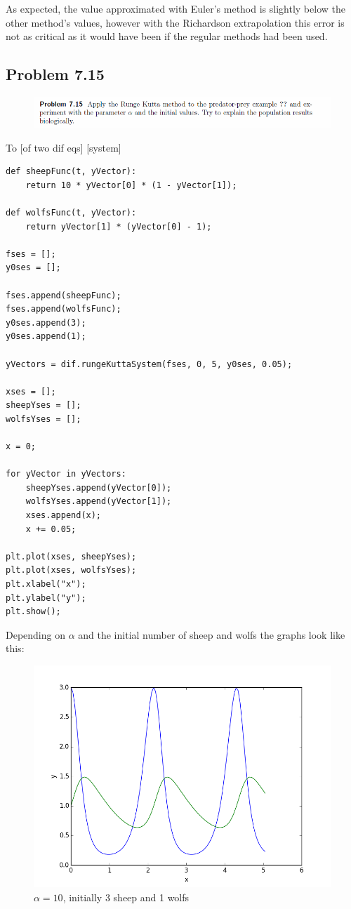 As expected, the value approximated with Euler's method is slightly below the other method's values, however with the Richardson extrapolation this error is not as critical as it would have been if the regular methods had been used.


\subsection{Problem 7.15}


\begin{figure}[!ht]
\includegraphics[width=1\textwidth]{chapters/images/desc-7-15}
\end{figure}

To [of two dif eqs] [system]

\begin{lstlisting}[caption=todo]
def sheepFunc(t, yVector):
	return 10 * yVector[0] * (1 - yVector[1]);

def wolfsFunc(t, yVector):
	return yVector[1] * (yVector[0] - 1);

fses = [];
y0ses = [];

fses.append(sheepFunc);
fses.append(wolfsFunc);
y0ses.append(3);
y0ses.append(1);

yVectors = dif.rungeKuttaSystem(fses, 0, 5, y0ses, 0.05);

xses = [];
sheepYses = [];
wolfsYses = [];

x = 0;

for yVector in yVectors:
	sheepYses.append(yVector[0]);
	wolfsYses.append(yVector[1]);
	xses.append(x);
	x += 0.05;

plt.plot(xses, sheepYses);
plt.plot(xses, wolfsYses);
plt.xlabel("x");
plt.ylabel("y");
plt.show();
\end{lstlisting}


Depending on $\alpha$ and the initial number of sheep and wolfs the graphs look like this:


\begin{figure}[!ht]
\includegraphics[width=1\textwidth]{chapters/images/figure-7-15-1}
\caption{$\alpha = 10$, initially 3 sheep and 1 wolfs}
\end{figure}



